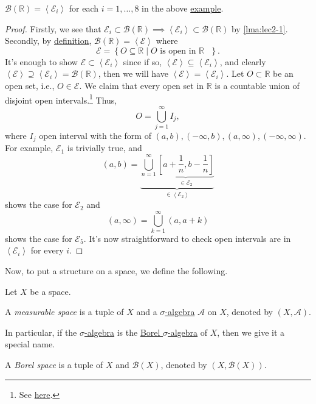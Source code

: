 \begin{proposition}
	\(\mathcal{B} (\mathbb{R} ) = \left<\mathcal{E}_{i}\right> \) for each \(i = 1, \dots, 8\) in the above \hyperref[eg:lec2]{example}.
\end{proposition}
\begin{proof}
	Firstly, we see that \(\mathcal{E} _{i}\subset \mathcal{B} (\mathbb{R} ) \implies \left<\mathcal{E} _{i}\right>\subset \mathcal{B} (\mathbb{R} )\) by \autoref{lma:lec2-1}.
	Secondly, by \hyperref[def:Borel-sigma-algebra]{definition}, \(\mathcal{B} (\mathbb{R} ) = \left<\mathcal{E} \right>\) where
	\[
		\mathcal{E} = \left\{O\subseteq \mathbb{R}\mid O \text{ is open in \(\mathbb{R}\) } \right\}.
	\]
	It's enough to show \(\mathcal{E} \subset \left<\mathcal{E} _{i}\right>\) since if so, \(\left<\mathcal{E} \right>\subseteq \left<\mathcal{E} _{i}\right>\), and clearly
	\(\left< \mathcal{E}  \right> \supseteq \left< \mathcal{E}_{i} \right> = \mathcal{B} (\mathbb{R}) \), then we will have
	\(\left< \mathcal{E}\right> = \left< \mathcal{E} _{i} \right> \). Let \(O\subset \mathbb{R} \) be an open set, i.e., \(O\in\mathcal{E}\).
	We claim that every open set in \(\mathbb{R} \) is a countable union of disjoint open intervals.\footnote{See \href{https://math.stackexchange.com/questions/318299/any-open-subset-of-bbb-r-is-a-countable-union-of-disjoint-open-intervals}{here}.} Thus,
	\[
		O = \bigcup_{j=1}^{\infty} I_{j},
	\]
	where \(I_{j}\) open interval with the form of \((a, b), (-\infty, b), (a, \infty), (-\infty, \infty)\). For example, \(\mathcal{E} _1\) is trivially true, and
	\[
		(a, b) = \underbrace{\bigcup_{n=1}^{\infty} \underbrace{\left[a+\frac{1}{n}, b-\frac{1}{n}\right]}_{\in \mathcal{E}_2}}_{\in\left<\mathcal{E} _2\right>}
	\]
	shows the case for \(\mathcal{E} _2\) and
	\[
		(a, \infty) = \bigcup_{k=1}^{\infty} (a, a+k)
	\]
	shows the case for \(\mathcal{E} _5\). It's now straightforward to check open intervals are in \(\left<\mathcal{E} _{i}\right>\) for every \(i\).
\end{proof}

Now, to put a structure on a space, we define the following.
\begin{definition*}
	Let \(X\) be a space.
	\begin{definition}\label{def:measurable-space}
		A \emph{measurable space} is a tuple of \(X\) and a \hyperref[def:sigma-algebra]{\(\sigma\)-algebra} \(\mathcal{A} \) on \(X\),
		denoted by \((X, \mathcal{A} )\).
	\end{definition}

	In particular, if the \hyperref[def:sigma-algebra]{\(\sigma\)-algebra} is the \hyperref[def:Borel-sigma-algebra]{Borel \(\sigma \)-algebra} of \(X\), then we give it a special name.
	\begin{definition}\label{def:Borel-space}
		A \emph{Borel space} is a tuple of \(X\) and \(\mathcal{B} (X)\), denoted by \((X, \mathcal{B} (X))\).
	\end{definition}
\end{definition*}


